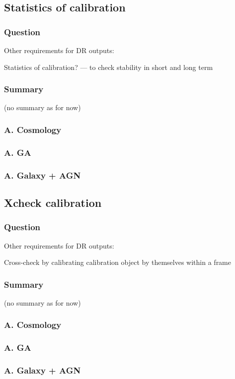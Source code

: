 \documentclass[a4paper,notitlepage]{article}
\begin{document}
\renewcommand{\thesubsection}{Q.8.0-\alph{subsection}}
\setcounter{subsection}{0}
\subsection{Statistics of calibration}

\subsubsection{Question}
Other requirements for DR outputs: 

Statistics of calibration? --- to check stability in short and long term

\subsubsection{Summary}

(no summary as for now)

\subsubsection{A. Cosmology}

\subsubsection{A. GA}

\subsubsection{A. Galaxy + AGN}




\subsection{Xcheck calibration}

\subsubsection{Question}
Other requirements for DR outputs: 

Cross-check by calibrating calibration object by themselves within a frame

\subsubsection{Summary}

(no summary as for now)

\subsubsection{A. Cosmology}

\subsubsection{A. GA}

\subsubsection{A. Galaxy + AGN}
\end{document}
